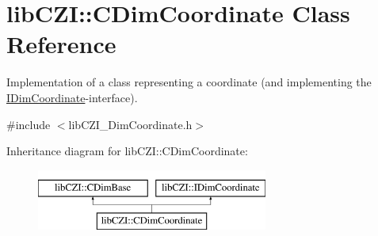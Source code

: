 \hypertarget{classlib_c_z_i_1_1_c_dim_coordinate}{}\section{lib\+C\+ZI\+:\+:C\+Dim\+Coordinate Class Reference}
\label{classlib_c_z_i_1_1_c_dim_coordinate}


Implementation of a class representing a coordinate (and implementing the {\ttfamily \hyperlink{classlib_c_z_i_1_1_i_dim_coordinate}{I\+Dim\+Coordinate}}-\/interface).  




{\ttfamily \#include $<$lib\+C\+Z\+I\+\_\+\+Dim\+Coordinate.\+h$>$}

Inheritance diagram for lib\+C\+ZI\+:\+:C\+Dim\+Coordinate\+:\begin{figure}[H]
\begin{center}
\leavevmode
\includegraphics[height=2.000000cm]{classlib_c_z_i_1_1_c_dim_coordinate}
\end{center}
\end{figure}
